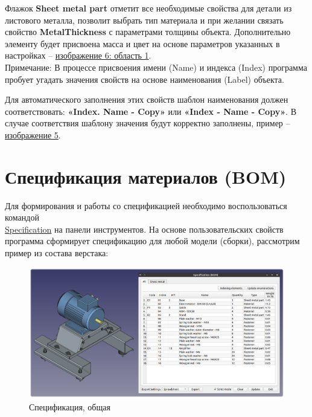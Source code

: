 \documentclass[a4paper,12pt]{article}
\begin{document}
Флажок \textbf{Sheet metal part} отметит все необходимые свойства для детали из листового металла, позволит выбрать тип материала и при желании связать свойство \textbf{MetalThickness} с параметрами толщины объекта. Дополнительно элементу будет присвоена масса и цвет на основе параметров указанных в настройках -- \hyperref[sec:pref_sm]{изображение 6: область 1}.\\

Примечание: В процессе присвоения имени (Name) и индекса (Index) программа пробует угадать значения свойств на основе наименования (Label) объекта.

Для автоматического заполнения этих свойств шаблон наименования должен соответствовать: \textbf{«Index. Name - Copy»} или \textbf{«Index - Name - Copy»}. В случае соответствия шаблону значения будут корректно заполнены, пример -- \hyperref[sec:properties]{изображение 5}.

\pagebreak




\section{Спецификация материалов (BOM)}

Для формирования и работы со спецификацией необходимо воспользоваться командой\\\hyperref[sec:4]{Specification} на панели инструментов. На основе пользовательских свойств программа сформирует спецификацию для любой модели (сборки), рассмотрим пример из состава верстака:

\begin{figure}[htp]
	\centering
	\includegraphics[width=1\textwidth]{img/specification_all.png}
	\caption{Спецификация, общая}
	\label{sec:specification_all}
\end{figure}
\end{document}

